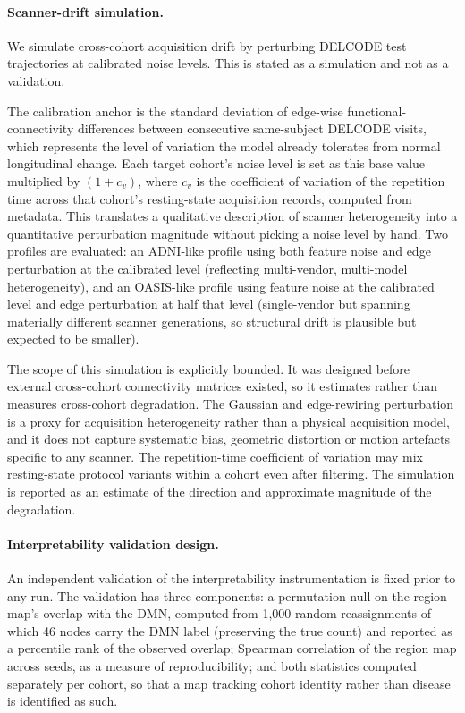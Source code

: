 \paragraph{Scanner-drift simulation.}
We simulate cross-cohort acquisition drift by perturbing \ac{DELCODE} test trajectories at
calibrated noise levels. This is stated as a simulation and not as a validation.

The calibration anchor is the standard deviation of edge-wise functional-connectivity
differences between consecutive same-subject \ac{DELCODE} visits, which represents the
level of variation the model already tolerates from normal longitudinal change. Each target
cohort's noise level is set as this base value multiplied by $(1 + c_v)$, where $c_v$ is
the coefficient of variation of the repetition time across that cohort's resting-state
acquisition records, computed from metadata. This translates a qualitative description of
scanner heterogeneity into a quantitative perturbation magnitude without picking a noise
level by hand. Two profiles are evaluated: an \ac{ADNI}-like profile using both feature
noise and edge perturbation at the calibrated level (reflecting multi-vendor, multi-model
heterogeneity), and an \ac{OASIS}-like profile using feature noise at the calibrated level
and edge perturbation at half that level (single-vendor but spanning materially different
scanner generations, so structural drift is plausible but expected to be smaller).

The scope of this simulation is explicitly bounded. It was designed before external
cross-cohort connectivity matrices existed, so it estimates rather than measures
cross-cohort degradation. The Gaussian and edge-rewiring perturbation is a proxy for
acquisition heterogeneity rather than a physical acquisition model, and it does not capture
systematic bias, geometric distortion or motion artefacts specific to any scanner. The
repetition-time coefficient of variation may mix resting-state protocol variants within a
cohort even after filtering. The simulation is reported as an estimate of the direction and
approximate magnitude of the degradation.

\paragraph{Interpretability validation design.}
An independent validation of the interpretability instrumentation is fixed prior to any
run. The validation has three components: a permutation null on the region map's overlap
with the \ac{DMN}, computed from 1,000 random reassignments of which 46 nodes carry the
\ac{DMN} label (preserving the true count) and reported as a percentile rank of the
observed overlap; Spearman correlation of the region map across seeds, as a measure of
reproducibility; and both statistics computed separately per cohort, so that a map
tracking cohort identity rather than disease is identified as such.

